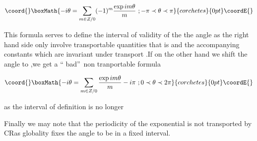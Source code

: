 \documentclass[a4paper,11pt]{article}
\begin{document}
\[\coord{}\boxMath{
-i\theta =\sum_{m\in Z/0}(-1)^{m}\frac{\exp im\theta }{m}\textrm{ };-\pi \prec
\theta \prec \pi 
}{corchetes}{0pt}\coordE{}\]

This formula serves to define the interval of validity of the the angle \myHighlight{$%
\theta $}\coordHE{} as the right hand side only involve transportable quantities that
is \coordHE{} and the accompanying constants \coordHE{}
which are invariant under transport .If on the other hand we shift the angle
to \myHighlight{$\theta \rightarrow \theta +\pi $}\coordHE{},we get a \textquotedblleft
bad\textquotedblright\ non tranportable formula

\[\coord{}\boxMath{
-i\theta =\sum_{m\in Z/0}\frac{\exp im\theta }{m}-i\pi \textrm{ };0\prec
\theta \prec 2\pi 
}{corchetes}{0pt}\coordE{}\]

as the interval of definition is no longer \myHighlight{$-\pi \prec \theta \prec \pi $}\coordHE{}

Finally we may note that the periodicity of the exponential is not
transported by CR\coordHE{}as globality fixes the angle to be in a fixed
interval.
\end{document}
